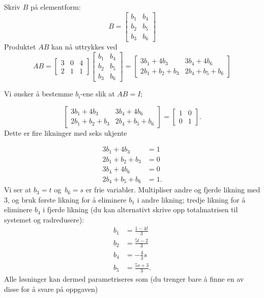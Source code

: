 \documentclass[notitlepage,a4paper,12pt,norsk]{IMFeksamen}
\newcommand{\0}{\V{0}}
\newcommand{\oppgslutt}{
\begin{center}
\pgfornament[width=6cm]{88}
\end{center}
}
\newenvironment{losning}{\begin{oppgave}}{\oppgslutt\end{oppgave}}
\begin{document}
\begin{losning}
Skriv $B$ på elementform:
\[
B=\begin{bmatrix}
b_1 & b_4\\
b_2 & b_5\\
b_3 & b_6
\end{bmatrix}
\]
Produktet $AB$ kan nå uttrykkes ved 
\[
AB=
\begin{bmatrix}
3 & 0 & 4 \\
2 & 1 & 1
\end{bmatrix}
\begin{bmatrix}
b_1 & b_4\\
b_2 & b_5\\
b_3 & b_6
\end{bmatrix}=
\begin{bmatrix}
3b_1+4b_3 & 3b_4+4b_6\\
2b_1+b_2+b_3 & 2b_4+b_5+b_6
\end{bmatrix}
\]

Vi ønsker å bestemme $b_i$-ene slik at $AB=I$;

\[
\begin{bmatrix}
3b_1+4b_3 & 3b_4+4b_6\\
2b_1+b_2+b_3 & 2b_4+b_5+b_6
\end{bmatrix}
=
\begin{bmatrix}
1 & 0\\
0 & 1
\end{bmatrix}.
\]
Dette er fire likninger med seks ukjente

\begin{align*}
3b_1+4b_3&=1\\
2b_1+b_2+b_3&=0\\
3b_4+4b_6&=0\\
2b_4+b_5+b_6&=1.
\end{align*}
Vi ser at $b_3=t$ og~$b_6=s$ er frie variabler. Multipliser andre og fjerde likning med $3$, og bruk første likning for å eliminere $b_1$ i andre likning; tredje likning for å eliminere $b_4$ i fjerde likning (du kan alternativt skrive opp totalmatrisen til systemet og radredusere):
\begin{align*}
b_1&=\frac{1-4t}{3}\\
b_2&=\frac{5t-2}{3}\\
b_4&=-\frac{4}{3}s\\
b_5&=\frac{5s+3}{3}.
\end{align*}
Alle løsninger kan dermed parametriseres som (du trenger bare å finne en av disse for å svare på oppgaven)


\end{losning}
\end{document}
